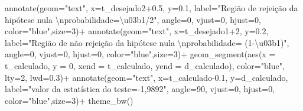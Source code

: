 \documentclass[
]{book}
\newenvironment{Shaded}{\begin{snugshade}}{\end{snugshade}}
\newcommand{\AttributeTok}[1]{\textcolor[rgb]{0.77,0.63,0.00}{#1}}
\newcommand{\DecValTok}[1]{\textcolor[rgb]{0.00,0.00,0.81}{#1}}
\newcommand{\FloatTok}[1]{\textcolor[rgb]{0.00,0.00,0.81}{#1}}
\newcommand{\FunctionTok}[1]{\textcolor[rgb]{0.00,0.00,0.00}{#1}}
\newcommand{\NormalTok}[1]{#1}
\newcommand{\SpecialCharTok}[1]{\textcolor[rgb]{0.00,0.00,0.00}{#1}}
\newcommand{\StringTok}[1]{\textcolor[rgb]{0.31,0.60,0.02}{#1}}
\begin{document}
\begin{Shaded}
\begin{Highlighting}[]
 \FunctionTok{annotate}\NormalTok{(}\AttributeTok{geom=}\StringTok{"text"}\NormalTok{, }\AttributeTok{x=}\NormalTok{t\_desejado2}\FloatTok{+0.5}\NormalTok{, }\AttributeTok{y=}\FloatTok{0.1}\NormalTok{, }\AttributeTok{label=}\StringTok{"Região de rejeição da hipótese nula }\SpecialCharTok{\textbackslash{}n}\StringTok{probabilidade=\textbackslash{}u03b1/2"}\NormalTok{, }\AttributeTok{angle=}\DecValTok{0}\NormalTok{, }\AttributeTok{vjust=}\DecValTok{0}\NormalTok{, }\AttributeTok{hjust=}\DecValTok{0}\NormalTok{, }\AttributeTok{color=}\StringTok{"blue"}\NormalTok{,}\AttributeTok{size=}\DecValTok{3}\NormalTok{)}\SpecialCharTok{+}
 \FunctionTok{annotate}\NormalTok{(}\AttributeTok{geom=}\StringTok{"text"}\NormalTok{, }\AttributeTok{x=}\NormalTok{t\_desejado1}\SpecialCharTok{+}\DecValTok{2}\NormalTok{, }\AttributeTok{y=}\FloatTok{0.2}\NormalTok{, }\AttributeTok{label=}\StringTok{"Região de não rejeição da hipótese nula }\SpecialCharTok{\textbackslash{}n}\StringTok{probabilidade= (1{-}\textbackslash{}u03b1)"}\NormalTok{, }\AttributeTok{angle=}\DecValTok{0}\NormalTok{, }\AttributeTok{vjust=}\DecValTok{0}\NormalTok{, }\AttributeTok{hjust=}\DecValTok{0}\NormalTok{, }\AttributeTok{color=}\StringTok{"blue"}\NormalTok{,}\AttributeTok{size=}\DecValTok{3}\NormalTok{)}\SpecialCharTok{+}
 \FunctionTok{geom\_segment}\NormalTok{(}\FunctionTok{aes}\NormalTok{(}\AttributeTok{x =}\NormalTok{ t\_calculado, }\AttributeTok{y =} \DecValTok{0}\NormalTok{, }\AttributeTok{xend =}\NormalTok{ t\_calculado, }\AttributeTok{yend =}\NormalTok{ d\_calculado), }\AttributeTok{color=}\StringTok{"blue"}\NormalTok{, }\AttributeTok{lty=}\DecValTok{2}\NormalTok{, }\AttributeTok{lwd=}\FloatTok{0.3}\NormalTok{)}\SpecialCharTok{+}
 \FunctionTok{annotate}\NormalTok{(}\AttributeTok{geom=}\StringTok{"text"}\NormalTok{, }\AttributeTok{x=}\NormalTok{t\_calculado}\FloatTok{{-}0.1}\NormalTok{, }\AttributeTok{y=}\NormalTok{d\_calculado, }\AttributeTok{label=}\StringTok{"valor da estatística do teste={-}1,9892"}\NormalTok{, }\AttributeTok{angle=}\DecValTok{90}\NormalTok{, }\AttributeTok{vjust=}\DecValTok{0}\NormalTok{, }\AttributeTok{hjust=}\DecValTok{0}\NormalTok{, }\AttributeTok{color=}\StringTok{"blue"}\NormalTok{,}\AttributeTok{size=}\DecValTok{3}\NormalTok{)}\SpecialCharTok{+}
  \FunctionTok{theme\_bw}\NormalTok{()}
\end{Highlighting}
\end{Shaded}
\end{document}
